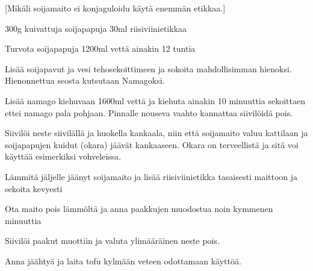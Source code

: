 [Mikäli soijamaito ei konjaguloidu käytä enemmän etikkaa.]

\begin{step}
300g kuivattuja soijapapuja
30ml riisiviinietikkaa

\method
Turvota soijapapuja 1200ml vettä ainakin 12 tuntia

Lisää soijapavut ja vesi tehosekoittimeen ja sokoita mahdollisimman hienoksi. Hienonnettua seosta kutsutaan Namagoksi.

Lisää namago kiehuvaan 1600ml vettä ja kiehuta ainakin 10 minuuttia sekoittaen ettei namago pala pohjaan. Pinnalle nouseva vaahto kannattaa siivilöidä pois.

Siivilöi neste siivilällä ja huokella kankaala, niin että soijamaito valuu kattilaan ja soijapapujen kuidut (okara) jäävät kankaaseen. Okara on terveellistä ja sitä voi käyttää esimerkiksi vohveleissa.

Lämmitä jäljelle jäänyt soijamaito  ja lisää riisiviinietikka tasaisesti maittoon ja sekoita kevyesti

Ota maito pois lämmöltä ja anna paakkujen muodostua noin kymmenen minuuttia

Siivilöi paakut muottiin ja valuta ylimääräinen neste pois.

Anna jäähtyä ja laita tofu kylmään veteen odottamaan käyttöä.

\end{step}
